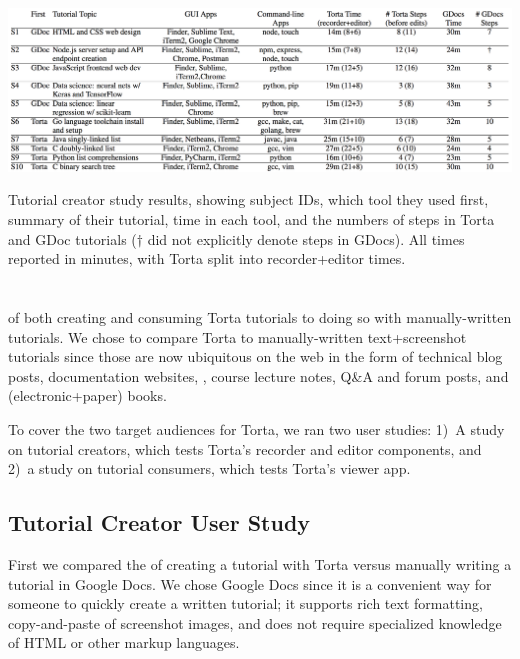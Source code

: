 \begin{table}
  \label{tab:creator-study}
  \includegraphics[width=\linewidth]{figures/torta/tbl_eval.png}
  \caption{Tutorial creator study results, showing subject IDs, which tool they used first, summary of their tutorial, time in each tool, and the numbers of steps in Torta and GDoc tutorials ($\dagger$ did not explicitly denote steps in GDocs). All times reported in minutes, with Torta split into recorder+editor times.}
\end{table}

\section{}

 of both creating and consuming Torta tutorials to doing
so with manually-written tutorials. We chose to  compare Torta to manually-written
text+screenshot tutorials since those are now ubiquitous on the web in the
form of technical blog posts, documentation websites, , course lecture
notes, Q\&A and forum posts, and (electronic+paper) books.
%

To cover the two target audiences for Torta, we ran two  user studies:
1)~A study on tutorial creators, which tests Torta's recorder and
editor components, and 2)~a study on tutorial consumers, which tests Torta's viewer app.


\subsection{Tutorial Creator User Study}

First we compared the  of creating a tutorial with Torta
versus manually writing a tutorial in Google Docs. We chose Google Docs
since it is a convenient way for someone to quickly create a written tutorial; it
supports rich text formatting, copy-and-paste of screenshot images, and
does not require specialized knowledge of HTML or other markup
languages. 


